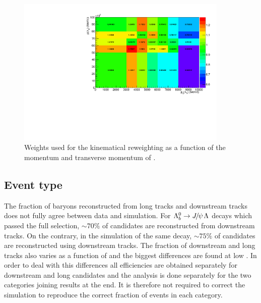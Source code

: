 \begin{figure}
\centering
\includegraphics[width=0.9\textwidth]{Lmumu/figs/ratio_Lb_p_pt.pdf}
 \caption{Weights used for the kinematical reweighting as a function of the momentum and transverse momentum of \Lb. }
\label{fig:kinWeight}
\end{figure}

\subsection{Event type}

The fraction of \Lz baryons reconstructed from long tracks and downstream tracks does not fully agree between data and simulation.
For $\Lb\to\jpsi\Lz$ decays which passed the full selection, $\sim 70\%$ of candidates are reconstructed from downstream tracks.
On the contrary, in the simulation of the same decay, $\sim 75\%$ of candidates are reconstructed using downstream tracks.
The fraction of downstream and long tracks also varies as a function of \qsq and the biggest differences are found at low \qsq.
In order to deal with this differences all efficiencies are obtained separately for downstream and long candidates and the analysis is done 
separately for the two categories joining results at the end. It is therefore not required to correct the simulation
to reproduce the correct fraction of events in each category.

